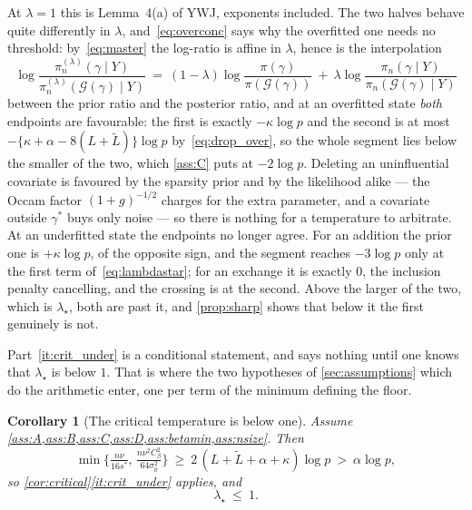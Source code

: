 \documentclass[aos]{imsart}
\newcommand{\Ltil}{\widetilde{L}}
\newcommand{\gainfloorsm}{%
    \min\bigl\{\tfrac{n\nu}{16s^{\ast}},\,
    \tfrac{n\nu^{2}C_\beta^{2}}{64\sigma_0^{2}}\bigr\}}
\theoremstyle{plain}
\newtheorem{corollary}{Corollary}[section]
\theoremstyle{definition}
\begin{document}
    At $\lambda=1$ this is Lemma~4(a) of YWJ, exponents included. The two
    halves behave quite differently in $\lambda$, and~\eqref{eq:overconc}
    says why the overfitted one needs no threshold: by~\eqref{eq:master} the
    log-ratio is affine in $\lambda$, hence is the interpolation
    \begin{equation}
        \label{eq:interp}
        \log\frac{\pi_n^{(\lambda)}(\gamma\mid Y)}
        {\pi_n^{(\lambda)}(\mathcal{G}(\gamma)\mid Y)}
        \ =\ (1-\lambda)\log\frac{\pi(\gamma)}{\pi(\mathcal{G}(\gamma))}
        \ +\ \lambda\log\frac{\pi_n(\gamma\mid Y)}
        {\pi_n(\mathcal{G}(\gamma)\mid Y)}
    \end{equation}
    between the prior ratio and the posterior ratio, and at an overfitted
    state \emph{both} endpoints are favourable: the first is exactly
    $-\kappa\log p$ and the second is at most
    $-\{\kappa+\alpha-8(L+\Ltil)\}\log p$ by~\eqref{eq:drop_over}, so the
    whole segment lies below the smaller of the two, which \cref{ass:C}
    puts at $-2\log p$. Deleting an uninfluential covariate is favoured by
    the sparsity prior and by the likelihood alike --- the Occam factor
    $(1+g)^{-1/2}$ charges for the extra parameter, and a covariate outside
    $\gamma^{\ast}$ buys only noise --- so there is nothing for a
    temperature to arbitrate. At an underfitted state the endpoints no
    longer agree. For an addition the prior one is $+\kappa\log p$, of the
    opposite sign, and the segment reaches $-3\log p$ only at the first term
    of~\eqref{eq:lambdastar}; for an exchange it is exactly $0$, the
    inclusion penalty cancelling, and the crossing is at the second. Above
    the larger of the two, which is $\lambda_\star$, both are past it, and
    \cref{prop:sharp} shows that below it the first genuinely is not.

    Part~\ref{it:crit_under} is a conditional statement, and says nothing
    until one knows that $\lambda_\star$ is below $1$. That is where the two
    hypotheses of \cref{sec:assumptions} which do the arithmetic enter, one
    per term of the minimum defining the floor.

    \begin{corollary}[The critical temperature is below one]
        \label{cor:below1}
        Assume \cref{ass:A,ass:B,ass:C,ass:D,ass:betamin,ass:nsize}. Then
        \begin{equation}
            \label{eq:floorlower}
            \gainfloorsm\ \geq\ 2\,(L+\Ltil+\alpha+\kappa)\log p
            \ >\ \alpha\log p ,
        \end{equation}
        so \cref{cor:critical}\ref{it:crit_under} applies, and
        \begin{equation}
            \label{eq:below1}
            \lambda_\star\ \leq\ 1 .
        \end{equation}
    \end{corollary}
\end{document}
